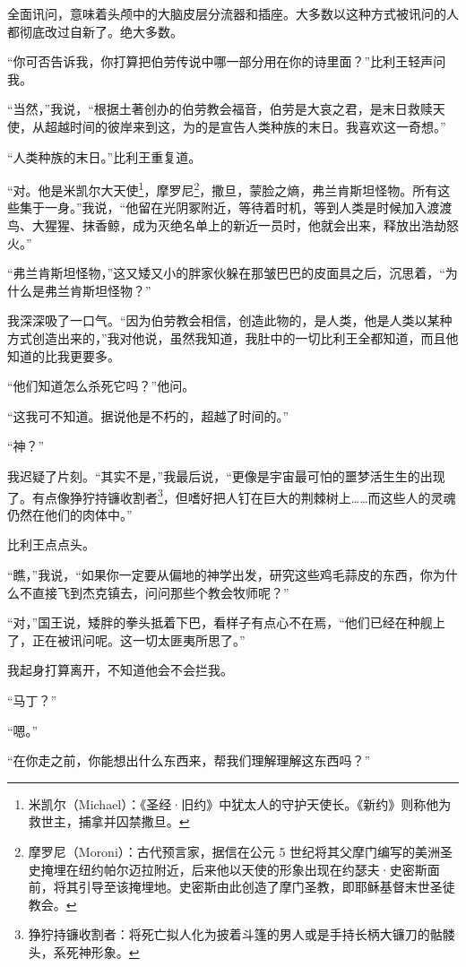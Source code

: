 \documentclass[AutoFakeBold=true]{book}
\begin{document}
全面讯问，意味着头颅中的大脑皮层分流器和插座。大多数以这种方式被讯问的人都彻底改过自新了。绝大多数。

``你可否告诉我，你打算把伯劳传说中哪一部分用在你的诗里面？''比利王轻声问我。

``当然，''我说，``根据土著创办的伯劳教会福音，伯劳是大哀之君，是末日救赎天使，从超越时间的彼岸来到这，为的是宣告人类种族的末日。我喜欢这一奇想。''

``人类种族的末日。''比利王重复道。

``对。他是米凯尔大天使\footnote{米凯尔（Michael）：《圣经·旧约》中犹太人的守护天使长。《新约》则称他为救世主，捕拿并囚禁撒旦。}，摩罗尼\footnote{摩罗尼（Moroni）：古代预言家，据信在公元 5 世纪将其父摩门编写的美洲圣史掩埋在纽约帕尔迈拉附近，后来他以天使的形象出现在约瑟夫·史密斯面前，将其引导至该掩埋地。史密斯由此创造了摩门圣教，即耶稣基督末世圣徒教会。}，撒旦，蒙脸之熵，弗兰肯斯坦怪物。所有这些集于一身。''我说，``他留在光阴冢附近，等待着时机，等到人类是时候加入渡渡鸟、大猩猩、抹香鲸，成为灭绝名单上的新近一员时，他就会出来，释放出浩劫怒火。''

``弗兰肯斯坦怪物，''这又矮又小的胖家伙躲在那皱巴巴的皮面具之后，沉思着，``为什么是弗兰肯斯坦怪物？''

我深深吸了一口气。``因为伯劳教会相信，创造此物的，是人类，他是人类以某种方式创造出来的，''我对他说，虽然我知道，我肚中的一切比利王全都知道，而且他知道的比我更要多。

``他们知道怎么杀死它吗？''他问。

``这我可不知道。据说他是不朽的，超越了时间的。''

``神？''

我迟疑了片刻。``其实不是，''我最后说，``更像是宇宙最可怕的噩梦活生生的出现了。有点像狰狞持镰收割者\footnote{狰狞持镰收割者：将死亡拟人化为披着斗篷的男人或是手持长柄大镰刀的骷髅头，系死神形象。}，但嗜好把人钉在巨大的荆棘树上……而这些人的灵魂仍然在他们的肉体中。''

比利王点点头。

``瞧，''我说，``如果你一定要从偏地的神学出发，研究这些鸡毛蒜皮的东西，你为什么不直接飞到杰克镇去，问问那些个教会牧师呢？''

``对，''国王说，矮胖的拳头抵着下巴，看样子有点心不在焉，``他们已经在种舰上了，正在被讯问呢。这一切太匪夷所思了。''

我起身打算离开，不知道他会不会拦我。

``马丁？''

``嗯。''

``在你走之前，你能想出什么东西来，帮我们理解理解这东西吗？''
\end{document}
